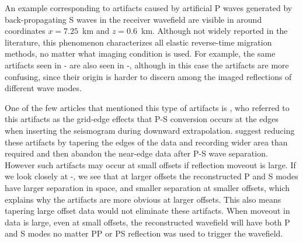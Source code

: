 An example corresponding to artifacts caused by artificial P waves generated by back-propagating S waves in the receiver wavefield are visible in  around coordinates $x=7.25$~km and $z=0.6$~km. Although not widely reported in the literature, this phenomenon characterizes all elastic reverse-time migration methods, no matter what imaging condition is used. For example, the same artifacts seen in - are also seen in  -, although in this case the artifacts are more confusing, since their origin is harder to discern among the imaged reflections of different wave modes.

One of the few articles that mentioned this type of artifacts is \cite{sun:286}, who referred to this artifacts as the grid-edge effects that P-S conversion occurs at the edges when inserting the seismogram during downward extrapolation. \cite{sun:286} suggest reducing these artifacts by tapering the edges of the data and recording wider area than required and then abandon the near-edge data after P-S wave separation. However such artifacts may occur at small offsets if reflection moveout is large. If we look closely at -, we see that at larger offsets the reconstructed P and S modes have larger separation in space, and smaller separation at smaller offsets, which explains why the artifacts are more obvious at larger offsets. This also means tapering large offset data would not eliminate these artifacts. When moveout in data is large, even at small offsets, the reconstructed wavefield will have both P and S modes no matter PP or PS reflection was used to trigger the wavefield.


